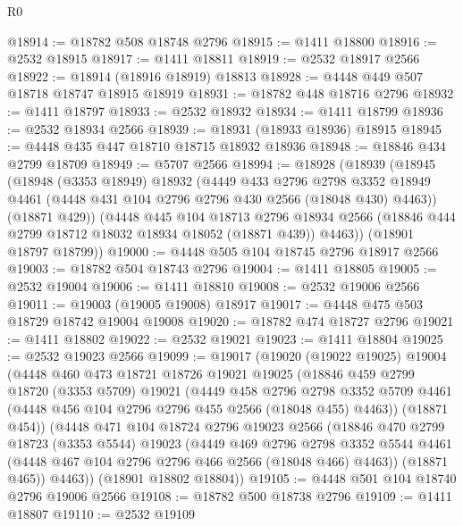 \begin{lexlean}{R0}
\begin{coremodule}
@18914 := @18782 @508 @18748 @2796
@18915 := @1411 @18800
@18916 := @2532 @18915
@18917 := @1411 @18811
@18919 := @2532 @18917 @2566
@18922 := @18914 (@18916 @18919) @18813
@18928 := @4448 @449 @507 @18718 @18747 @18915 @18919
@18931 := @18782 @448 @18716 @2796
@18932 := @1411 @18797
@18933 := @2532 @18932
@18934 := @1411 @18799
@18936 := @2532 @18934 @2566
@18939 := @18931 (@18933 @18936) @18915
@18945 := @4448 @435 @447 @18710 @18715 @18932 @18936
@18948 := @18846 @434 @2799 @18709
@18949 := @5707 @2566
@18994 := @18928
    (@18939
      (@18945
        (@18948
          (@3353 @18949)
          @18932
          (@4449
            @433
            @2796
            @2798
            @3352
            @18949
            @4461
            (@4448 @431 @104 @2796 @2796 @430 @2566 (@18048 @430) @4463))
          (@18871 @429))
        (@4448
          @445
          @104
          @18713
          @2796
          @18934
          @2566
          (@18846 @444 @2799 @18712 @18032 @18934 @18052 (@18871 @439))
          @4463))
      (@18901 @18797 @18799))
@19000 := @4448 @505 @104 @18745 @2796 @18917 @2566
@19003 := @18782 @504 @18743 @2796
@19004 := @1411 @18805
@19005 := @2532 @19004
@19006 := @1411 @18810
@19008 := @2532 @19006 @2566
@19011 := @19003 (@19005 @19008) @18917
@19017 := @4448 @475 @503 @18729 @18742 @19004 @19008
@19020 := @18782 @474 @18727 @2796
@19021 := @1411 @18802
@19022 := @2532 @19021
@19023 := @1411 @18804
@19025 := @2532 @19023 @2566
@19099 := @19017
    (@19020
      (@19022 @19025)
      @19004
      (@4448
        @460
        @473
        @18721
        @18726
        @19021
        @19025
        (@18846
          @459
          @2799
          @18720
          (@3353 @5709)
          @19021
          (@4449
            @458
            @2796
            @2798
            @3352
            @5709
            @4461
            (@4448 @456 @104 @2796 @2796 @455 @2566 (@18048 @455) @4463))
          (@18871 @454))
        (@4448
          @471
          @104
          @18724
          @2796
          @19023
          @2566
          (@18846
            @470
            @2799
            @18723
            (@3353 @5544)
            @19023
            (@4449
              @469
              @2796
              @2798
              @3352
              @5544
              @4461
              (@4448 @467 @104 @2796 @2796 @466 @2566 (@18048 @466) @4463))
            (@18871 @465))
          @4463))
      (@18901 @18802 @18804))
@19105 := @4448 @501 @104 @18740 @2796 @19006 @2566
@19108 := @18782 @500 @18738 @2796
@19109 := @1411 @18807
@19110 := @2532 @19109

\end{coremodule}
\end{lexlean}
